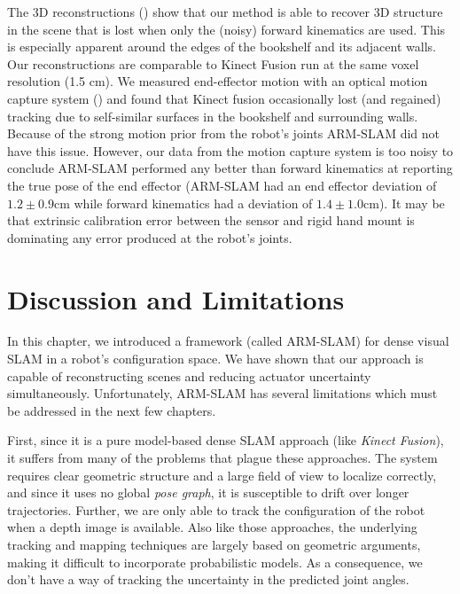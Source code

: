 The 3D reconstructions () show that our method is able to recover 3D structure in the scene that is lost when only the (noisy) forward kinematics are used. This is especially apparent around the edges of the bookshelf and its adjacent walls. Our reconstructions are comparable to Kinect Fusion run at the same voxel resolution (1.5 cm). We measured end-effector motion with an optical 
motion capture system () and found that Kinect fusion occasionally lost (and regained) tracking due to self-similar surfaces in the bookshelf and surrounding walls. Because of the strong motion prior from the robot's joints ARM-SLAM did not have this issue. However, our data from the motion capture system is too noisy to conclude ARM-SLAM performed any better than forward kinematics at reporting the true pose of the end effector (ARM-SLAM had an end effector deviation of $1.2 \pm 0.9 \text{cm}$ while forward kinematics had a deviation of $1.4 \pm 1.0 \text{cm}$). It may be that extrinsic calibration error between the sensor and rigid hand mount is dominating any error produced at the robot's joints.

\section{Discussion and Limitations}
In this chapter, we introduced a framework (called ARM-SLAM) for dense visual SLAM in a robot's configuration space. We have shown that our approach is capable of reconstructing scenes and reducing actuator uncertainty simultaneously. Unfortunately, ARM-SLAM has several limitations which must be addressed in the next few chapters.

First, since it is a pure model-based dense SLAM approach (like \textit{Kinect Fusion}\cite{KinectFusion}), it suffers from many of the problems that plague these approaches. The system requires clear geometric structure and a large field of view to localize correctly, and since it uses no global \textit{pose graph}, it is susceptible to drift over longer trajectories. Further, we are only able to track the configuration of the robot when a depth image is available. Also like those approaches, the underlying tracking and mapping techniques are largely based on geometric arguments, making it difficult to incorporate probabilistic models. As a consequence, we don't have a way of tracking the uncertainty in the predicted joint angles.

